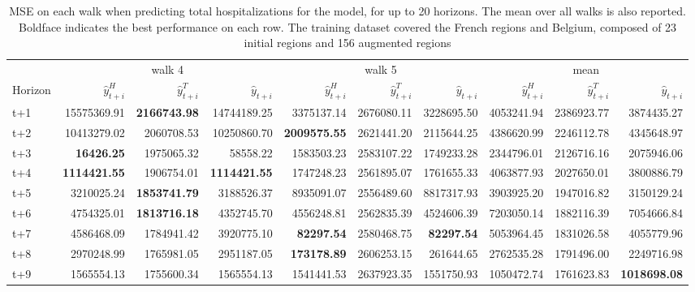 \begin{table}[H]
\centering
\caption{MSE on each walk when predicting total hospitalizations for the model, for up to 20 horizons. The mean over all walks is also reported. Boldface indicates the best performance on each row. The training dataset covered the French regions and Belgium, composed of 23 initial regions and 156 augmented regions }
\label{tab:MSE_walk_assemble}
\begin{tabular}{lrrrrrrrrr}
\toprule
 & \multicolumn{3}{c}{walk 4} & \multicolumn{3}{c}{walk 5} & \multicolumn{3}{c}{mean} 
\\

\cmidrule(lr){2-4} \cmidrule(lr){5-7} \cmidrule(lr){8-10} 
Horizon & $\hat{y}_{t+i}^H$ & $\hat{y}_{t+i}^T$ & $\hat{y}_{t+i}$ & $\hat{y}_{t+i}^H$ & $\hat{y}_{t+i}^T$ & $\hat{y}_{t+i}$ & $\hat{y}_{t+i}^H$ & $\hat{y}_{t+i}^T$ & $\hat{y}_{t+i}$ \\
\midrule
t+1  & 15575369.91  & \textbf{2166743.98}  & 14744189.25  & 3375137.14  & 2676080.11  & 3228695.50  & 4053241.94  & 2386923.77  & 3874435.27  \\
t+2  & 10413279.02  & 2060708.53  & 10250860.70  & \textbf{2009575.55}  & 2621441.20  & 2115644.25  & 4386620.99  & 2246112.78  & 4345648.97  \\
t+3  & \textbf{16426.25}  & 1975065.32  & 58558.22  & 1583503.23  & 2583107.22  & 1749233.28  & 2344796.01  & 2126716.16  & 2075946.06  \\
t+4  & \textbf{1114421.55}  & 1906754.01  & \textbf{1114421.55}  & 1747248.23  & 2561895.07  & 1761655.33  & 4063877.93  & 2027650.01  & 3800886.79  \\
t+5  & 3210025.24  & \textbf{1853741.79}  & 3188526.37  & 8935091.07  & 2556489.60  & 8817317.93  & 3903925.20  & 1947016.82  & 3150129.24  \\
t+6  & 4754325.01  & \textbf{1813716.18}  & 4352745.70  & 4556248.81  & 2562835.39  & 4524606.39  & 7203050.14  & 1882116.39  & 7054666.84  \\
t+7  & 4586468.09  & 1784941.42  & 3920775.10  & \textbf{82297.54}  & 2580468.75  & \textbf{82297.54}  & 5053964.45  & 1831026.58  & 4055779.96  \\
t+8  & 2970248.99  & 1765981.05  & 2951187.05  & \textbf{173178.89}  & 2606253.15  & 261644.65  & 2762535.28  & 1791496.00  & 2249716.98  \\
t+9  & 1565554.13  & 1755600.34  & 1565554.13  & 1541441.53  & 2637923.35  & 1551750.93  & 1050472.74  & 1761623.83  & \textbf{1018698.08}  \\

\end{tabular}
\end{table}

